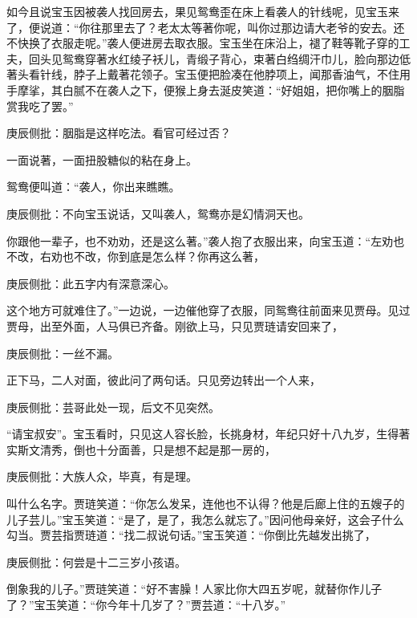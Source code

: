 \begin{parag}


    如今且说宝玉因被袭人找回房去，果见鸳鸯歪在床上看袭人的针线呢，见宝玉来了，便说道：“你往那里去了？老太太等著你呢，叫你过那边请大老爷的安去。还不快换了衣服走呢。”袭人便进房去取衣服。宝玉坐在床沿上，褪了鞋等靴子穿的工夫，回头见鸳鸯穿著水红绫子袄儿，青缎子背心，束著白绉绸汗巾儿，脸向那边低著头看针线，脖子上戴著花领子。宝玉便把脸凑在他脖项上，闻那香油气，不住用手摩挲，其白腻不在袭人之下，便猴上身去涎皮笑道：“好姐姐，把你嘴上的胭脂赏我吃了罢。”\begin{note}庚辰侧批：胭脂是这样吃法。看官可经过否？\end{note}一面说著，一面扭股糖似的粘在身上。
\end{parag}


\begin{parag}


    鸳鸯便叫道：“袭人，你出来瞧瞧。\begin{note}庚辰侧批：不向宝玉说话，又叫袭人，鸳鸯亦是幻情洞天也。\end{note}你跟他一辈子，也不劝劝，还是这么著。”袭人抱了衣服出来，向宝玉道：“左劝也不改，右劝也不改，你到底是怎么样？你再这么著，\begin{note}庚辰侧批：此五字内有深意深心。\end{note}这个地方可就难住了。”一边说，一边催他穿了衣服，同鸳鸯往前面来见贾母。见过贾母，出至外面，人马俱已齐备。刚欲上马，只见贾琏请安回来了，\begin{note}庚辰侧批：一丝不漏。\end{note}正下马，二人对面，彼此问了两句话。只见旁边转出一个人来，\begin{note}庚辰侧批：芸哥此处一现，后文不见突然。\end{note}“请宝叔安”。宝玉看时，只见这人容长脸，长挑身材，年纪只好十八九岁，生得著实斯文清秀，倒也十分面善，只是想不起是那一房的，\begin{note}庚辰侧批：大族人众，毕真，有是理。\end{note}叫什么名字。贾琏笑道：“你怎么发呆，连他也不认得？他是后廊上住的五嫂子的儿子芸儿。”宝玉笑道：“是了，是了，我怎么就忘了。”因问他母亲好，这会子什么勾当。贾芸指贾琏道：“找二叔说句话。”宝玉笑道：“你倒比先越发出挑了，\begin{note}庚辰侧批：何尝是十二三岁小孩语。\end{note}倒象我的儿子。”贾琏笑道：“好不害臊！人家比你大四五岁呢，就替你作儿子了？”宝玉笑道：“你今年十几岁了？”贾芸道：“十八岁。”
\end{parag}


